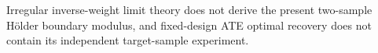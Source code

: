Irregular inverse-weight limit theory does not derive the present two-sample H\"older boundary modulus, and fixed-design ATE optimal recovery does not contain its independent target-sample experiment.
